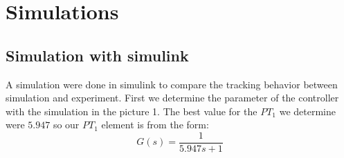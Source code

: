 \section{Simulations}

\subsection{Simulation with simulink}
A simulation were done in simulink to compare the tracking behavior between simulation and experiment.
First we determine the parameter of the controller with the simulation in the picture 1.
The best value for the $PT_{1}$ we determine were $5.947$
so our $PT_{1}$ element is from the form:
\begin{equation}
G(s) = \frac{1}{5.947s+1}
\end{equation}